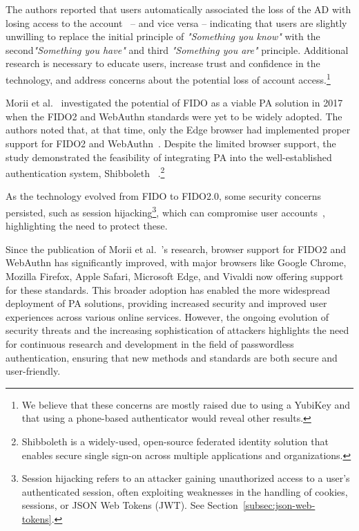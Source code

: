 The authors reported that users automatically associated the loss of the AD with
losing access to the account~\cite{ghrobany2020fido2} -- and vice versa --
indicating that users are slightly unwilling to replace the initial principle of
\textit{"Something you know"} with the second\textit{"Something you have"} and
third \textit{"Something you are"} principle.
Additional research is necessary to educate users, increase trust and confidence
in the technology, and address concerns about the potential loss of account
access.\footnote{
  We believe that these concerns are mostly raised due to using a YubiKey
  and that using a phone-based authenticator would reveal other results.
}

Morii et al.~\cite{morii2017research} investigated the potential of FIDO as a
viable PA solution in 2017 when the FIDO2 and WebAuthn standards were yet to be
widely adopted.
The authors noted that, at that time, only the Edge browser had implemented
proper support for FIDO2 and WebAuthn~\cite{morii2017research}.
Despite the limited browser support, the study demonstrated the feasibility
of integrating PA into the well-established authentication system, Shibboleth
~\cite{shibboleth, morii2017research}.\footnote{
  Shibboleth is a widely-used, open-source federated identity solution that
  enables secure single sign-on across multiple applications and organizations.
}


As the technology evolved from FIDO to FIDO2.0, some security concerns
persisted, such as session hijacking\footnote{
  Session hijacking refers to an attacker gaining unauthorized access to a
  user's authenticated session, often exploiting weaknesses in the handling of
  cookies, sessions, or JSON Web Tokens (JWT).
  See Section~\ref{subsec:json-web-tokens}.
}, which can compromise user accounts~\cite{morii2017research}, highlighting
the need to protect these.

Since the publication of Morii et al.~'s research, browser support for FIDO2 and
WebAuthn has significantly improved, with major browsers like Google Chrome,
Mozilla Firefox, Apple Safari, Microsoft Edge, and Vivaldi now offering
support for these standards.
This broader adoption has enabled the more widespread deployment of PA solutions,
providing increased security and improved user experiences across various online
services.
However, the ongoing evolution of security threats and the increasing
sophistication of attackers highlights the need for continuous research and
development in the field of passwordless authentication, ensuring that new
methods and standards are both secure and user-friendly.

